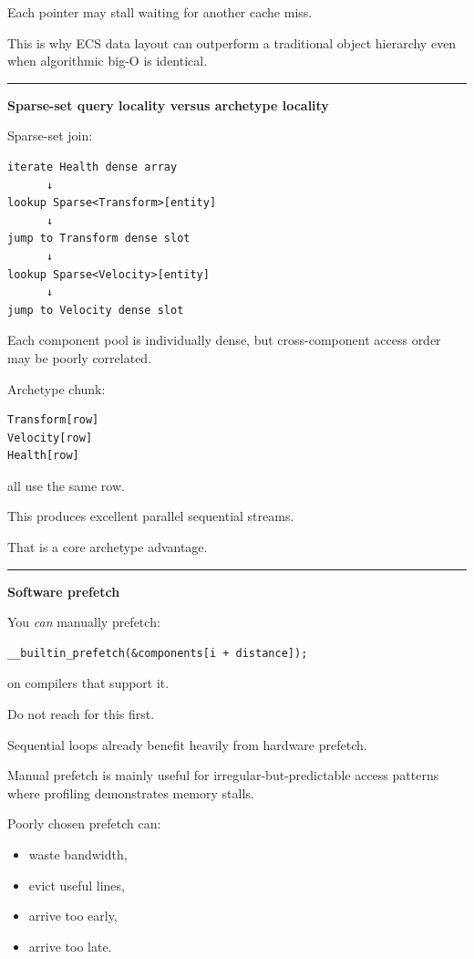 Each pointer may stall waiting for another cache miss.

This is why ECS data layout can outperform a traditional object hierarchy even when algorithmic big-O is identical.

\begin{center}\rule{0.5\linewidth}{0.5pt}\end{center}

\textbf{Sparse-set query locality versus archetype locality}

Sparse-set join:

\begin{verbatim}
iterate Health dense array
      ↓
lookup Sparse<Transform>[entity]
      ↓
jump to Transform dense slot
      ↓
lookup Sparse<Velocity>[entity]
      ↓
jump to Velocity dense slot
\end{verbatim}

Each component pool is individually dense, but cross-component access order may be poorly correlated.

Archetype chunk:

\begin{verbatim}
Transform[row]
Velocity[row]
Health[row]
\end{verbatim}

all use the same row.

This produces excellent parallel sequential streams.

That is a core archetype advantage.

\begin{center}\rule{0.5\linewidth}{0.5pt}\end{center}

\textbf{Software prefetch}

You \emph{can} manually prefetch:

\begin{verbatim}
__builtin_prefetch(&components[i + distance]);
\end{verbatim}

on compilers that support it.

Do not reach for this first.

Sequential loops already benefit heavily from hardware prefetch.

Manual prefetch is mainly useful for irregular-but-predictable access patterns where profiling demonstrates memory stalls.

Poorly chosen prefetch can:

\begin{itemize}
\tightlist
\item
  waste bandwidth,
\item
  evict useful lines,
\item
  arrive too early,
\item
  arrive too late.
\end{itemize}

